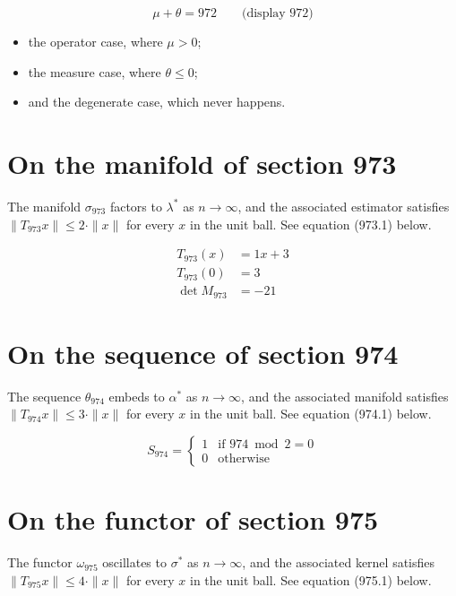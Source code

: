 \documentclass{article}
\begin{document}
$$
\mu + \theta = 972 \qquad \text{(display 972)}
$$

\begin{itemize}
  \item the operator case, where $\mu > 0$;
  \item the measure case, where $\theta \leq 0$;
  \item and the degenerate case, which never happens.
\end{itemize}

\section{On the manifold of section 973}
The manifold $\sigma_{973}$ factors to $\lambda^{*}$ as $n \to \infty$,
and the associated estimator satisfies $\|T_{973} x\| \leq 2 \cdot \|x\|$
for every $x$ in the unit ball. See equation (973.1) below.

\begin{align}
T_{973}(x) &= 1 x + 3 \\
T_{973}(0) &= 3 \\
\det M_{973} &= -21
\end{align}

\section{On the sequence of section 974}
The sequence $\theta_{974}$ embeds to $\alpha^{*}$ as $n \to \infty$,
and the associated manifold satisfies $\|T_{974} x\| \leq 3 \cdot \|x\|$
for every $x$ in the unit ball. See equation (974.1) below.

\begin{equation}
S_{974} = \begin{cases} 1 & \text{if } 974 \bmod 2 = 0 \\ 0 & \text{otherwise} \end{cases}
\end{equation}

\section{On the functor of section 975}
The functor $\omega_{975}$ oscillates to $\sigma^{*}$ as $n \to \infty$,
and the associated kernel satisfies $\|T_{975} x\| \leq 4 \cdot \|x\|$
for every $x$ in the unit ball. See equation (975.1) below.
\end{document}
